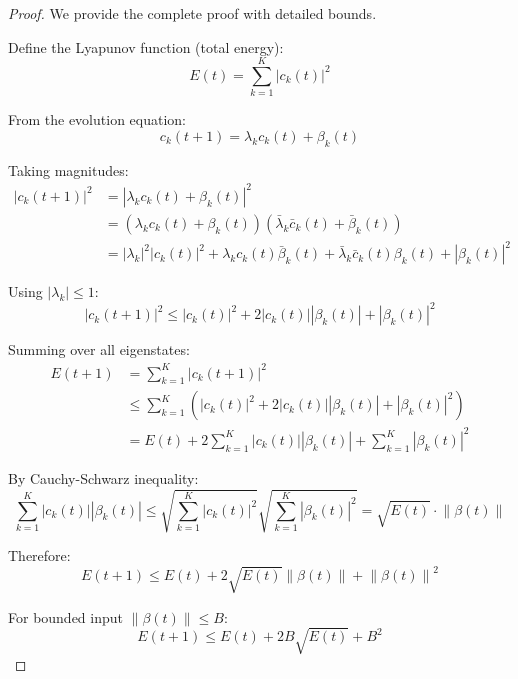 \documentclass[11pt,letterpaper]{article}
\newcommand{\norm}[1]{\left\|#1\right\|}
\begin{document}
\begin{proof}
We provide the complete proof with detailed bounds.

Define the Lyapunov function (total energy):
\begin{equation}
    E(t) = \sum_{k=1}^{K} |c_k(t)|^2
\end{equation}

From the evolution equation:
\begin{equation}
    c_k(t+1) = \lambda_k c_k(t) + \beta_k(t)
\end{equation}

Taking magnitudes:
\begin{align}
    |c_k(t+1)|^2 &= |\lambda_k c_k(t) + \beta_k(t)|^2 \\
    &= (\lambda_k c_k(t) + \beta_k(t))(\bar{\lambda}_k \bar{c}_k(t) + \bar{\beta}_k(t)) \\
    &= |\lambda_k|^2 |c_k(t)|^2 + \lambda_k c_k(t) \bar{\beta}_k(t) + \bar{\lambda}_k \bar{c}_k(t) \beta_k(t) + |\beta_k(t)|^2
\end{align}

Using $|\lambda_k| \leq 1$:
\begin{equation}
    |c_k(t+1)|^2 \leq |c_k(t)|^2 + 2|c_k(t)||\beta_k(t)| + |\beta_k(t)|^2
\end{equation}

Summing over all eigenstates:
\begin{align}
    E(t+1) &= \sum_{k=1}^{K} |c_k(t+1)|^2 \\
    &\leq \sum_{k=1}^{K} \left(|c_k(t)|^2 + 2|c_k(t)||\beta_k(t)| + |\beta_k(t)|^2\right) \\
    &= E(t) + 2\sum_{k=1}^{K} |c_k(t)||\beta_k(t)| + \sum_{k=1}^{K}|\beta_k(t)|^2
\end{align}

By Cauchy-Schwarz inequality:
\begin{equation}
    \sum_{k=1}^{K} |c_k(t)||\beta_k(t)| \leq \sqrt{\sum_{k=1}^{K} |c_k(t)|^2} \sqrt{\sum_{k=1}^{K} |\beta_k(t)|^2} = \sqrt{E(t)} \cdot \norm{\beta(t)}
\end{equation}

Therefore:
\begin{equation}
    E(t+1) \leq E(t) + 2\sqrt{E(t)} \norm{\beta(t)} + \norm{\beta(t)}^2
\end{equation}

For bounded input $\norm{\beta(t)} \leq B$:
\begin{equation}
    E(t+1) \leq E(t) + 2B\sqrt{E(t)} + B^2
\end{equation}


\end{proof}
\end{document}
